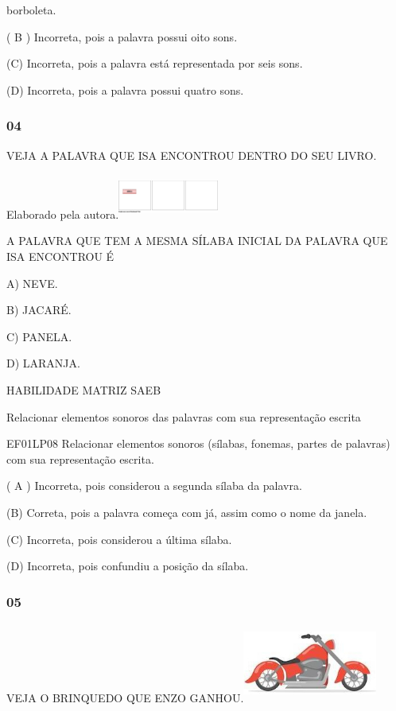 \begin{escola}
borboleta.

( B ) Incorreta, pois a palavra possui oito sons.

(C) Incorreta, pois a palavra está representada por seis sons.

(D) Incorreta, pois a palavra possui quatro sons.

\subsubsection{04}\label{section-76}

VEJA A PALAVRA QUE ISA ENCONTROU DENTRO DO SEU LIVRO.

Elaborado pela
autora.\includegraphics[width=1.29722in,height=0.57917in]{media/image244.png}

A PALAVRA QUE TEM A MESMA SÍLABA INICIAL DA PALAVRA QUE ISA ENCONTROU É

A) NEVE.

B) JACARÉ.

C) PANELA.

D) LARANJA.

HABILIDADE MATRIZ SAEB

Relacionar elementos sonoros das palavras com sua representação escrita

EF01LP08 Relacionar elementos sonoros (sílabas, fonemas, partes de
palavras) com sua representação escrita.

( A ) Incorreta, pois considerou a segunda sílaba da palavra.

(B) Correta, pois a palavra começa com já, assim como o nome da janela.

(C) Incorreta, pois considerou a última sílaba.

(D) Incorreta, pois confundiu a posição da
sílaba.\protect\hypertarget{_heading=h.33l0sngjt3hj}{}{}

\subsubsection{05}\label{section-77}

VEJA O BRINQUEDO QUE ENZO
GANHOU.\includegraphics[width=1.73681in,height=1.03125in]{media/image245.jpg}


\end{escola}

